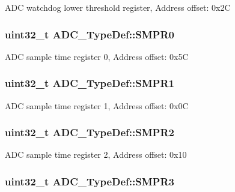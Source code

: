 A\-D\-C watchdog lower threshold register, Address offset\-: 0x2\-C \hypertarget{struct_a_d_c___type_def_afaad4e722a535b9881668f07b898daa2}{
\subsubsection[{S\-M\-P\-R0}]{ uint32\-\_\-t A\-D\-C\-\_\-\-Type\-Def\-::\-S\-M\-P\-R0}}\label{struct_a_d_c___type_def_afaad4e722a535b9881668f07b898daa2}
A\-D\-C sample time register 0, Address offset\-: 0x5\-C \hypertarget{struct_a_d_c___type_def_a73009a8122fcc628f467a4e997109347}{
\subsubsection[{S\-M\-P\-R1}]{ uint32\-\_\-t A\-D\-C\-\_\-\-Type\-Def\-::\-S\-M\-P\-R1}}\label{struct_a_d_c___type_def_a73009a8122fcc628f467a4e997109347}
A\-D\-C sample time register 1, Address offset\-: 0x0\-C \hypertarget{struct_a_d_c___type_def_a9e68fe36c4c8fbbac294b5496ccf7130}{
\subsubsection[{S\-M\-P\-R2}]{ uint32\-\_\-t A\-D\-C\-\_\-\-Type\-Def\-::\-S\-M\-P\-R2}}\label{struct_a_d_c___type_def_a9e68fe36c4c8fbbac294b5496ccf7130}
A\-D\-C sample time register 2, Address offset\-: 0x10 \hypertarget{struct_a_d_c___type_def_abd2c17178853fe4ec3491bab206042d8}{
\subsubsection[{S\-M\-P\-R3}]{ uint32\-\_\-t A\-D\-C\-\_\-\-Type\-Def\-::\-S\-M\-P\-R3}}\label{struct_a_d_c___type_def_abd2c17178853fe4ec3491bab206042d8}
